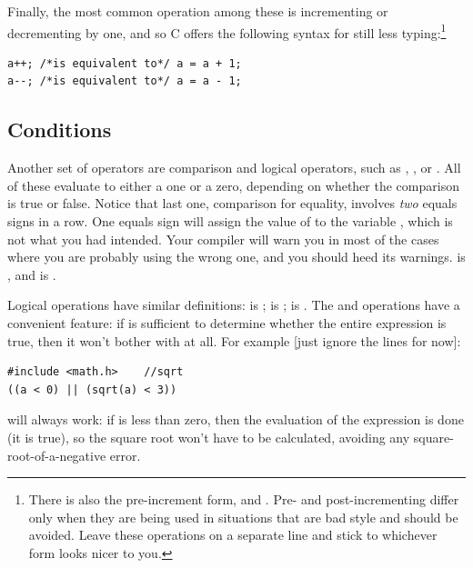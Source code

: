 Finally, the most common operation among these is incrementing or decrementing by one, and so C offers the
following syntax for still less typing:\footnote{There is also the pre-increment form,  and
. Pre- and post-incrementing differ only when they are being used in situations that are bad style and should
be avoided. Leave these operations on a separate line and stick to whichever form looks nicer to you.} \\
\begin{lstlisting}
a++; /*is equivalent to*/ a = a + 1;
a--; /*is equivalent to*/ a = a - 1;
\end{lstlisting}



\subsection{Conditions} 	
\label{forloops}    
\cindex{<} \cindex{>} \cindex{==}
Another set of operators are comparison and logical operators, such as ,
, or . All of these evaluate to either a one or a zero, depending on whether the
comparison is true or false. Notice that last one, comparison for equality, involves {\sl two} equals
signs in a row. One equals sign  will assign the value of  to the variable , which is not what
you had intended. Your compiler will warn you in most of the cases where you are
probably using the wrong one, and you should heed its warnings.  is , and  is .

Logical operations have similar definitions: \cindex{\&\&}  
  
 is ;  is ;  is .
The \ci{\&\&} and \ci{||} operations have a convenient feature: if  is sufficient to determine whether
the entire expression is true, then it won't bother with  at all. For example [just ignore the  lines for now]:
\begin{lstlisting}
#include <math.h>    //sqrt
((a < 0) || (sqrt(a) < 3))
\end{lstlisting}
will always work: if  is less than zero, then the evaluation
of the expression is done (it is true), so the square root won't have
to be calculated, avoiding any square-root-of-a-negative error. 

